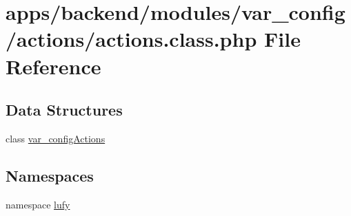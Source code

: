 \hypertarget{backend_2modules_2var__config_2actions_2actions_8class_8php}{\section{apps/backend/modules/var\-\_\-config/actions/actions.class.\-php File Reference}
\label{backend_2modules_2var__config_2actions_2actions_8class_8php}
}
\subsection*{Data Structures}
\begin{DoxyCompactItemize}
\item 
class \hyperlink{classvar__config_actions}{var\-\_\-config\-Actions}
\end{DoxyCompactItemize}
\subsection*{Namespaces}
\begin{DoxyCompactItemize}
\item 
namespace \hyperlink{namespacelufy}{lufy}
\end{DoxyCompactItemize}
